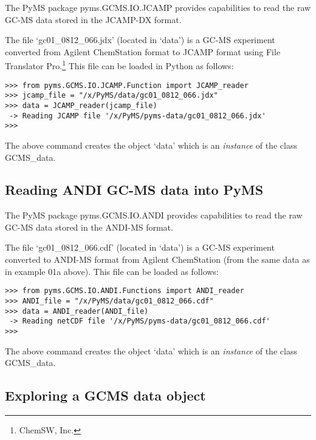 
The PyMS package pyms.GCMS.IO.JCAMP provides capabilities to read the raw
GC-MS data stored in the JCAMP-DX format.

The file `gc01\_0812\_066.jdx' (located in `data') is a GC-MS experiment
converted from Agilent ChemStation format to JCAMP format using File
Translator Pro.\footnote{ChemSW, Inc.} This file can be loaded in Python
as follows:

\begin{verbatim}
>>> from pyms.GCMS.IO.JCAMP.Function import JCAMP_reader
>>> jcamp_file = "/x/PyMS/data/gc01_0812_066.jdx"
>>> data = JCAMP_reader(jcamp_file)
 -> Reading JCAMP file '/x/PyMS/pyms-data/gc01_0812_066.jdx'
>>>
\end{verbatim}

\noindent
The above command creates the object `data' which is an {\em instance}
of the class GCMS\_data.

\subsection{Reading ANDI GC-MS data into PyMS}


The PyMS package pyms.GCMS.IO.ANDI provides capabilities to read the raw
GC-MS data stored in the ANDI-MS format.

The file `gc01\_0812\_066.cdf' (located in `data') is a GC-MS experiment
converted to ANDI-MS format from Agilent ChemStation (from the same data as in
example 01a above). This file can be loaded as follows:

\begin{verbatim}
>>> from pyms.GCMS.IO.ANDI.Functions import ANDI_reader
>>> ANDI_file = "/x/PyMS/data/gc01_0812_066.cdf"
>>> data = ANDI_reader(ANDI_file)
 -> Reading netCDF file '/x/PyMS/pyms-data/gc01_0812_066.cdf'
>>>
\end{verbatim}

\noindent
The above command creates the object `data' which is an {\em instance}
of the class GCMS\_data.

\subsection{Exploring a GCMS data object}


